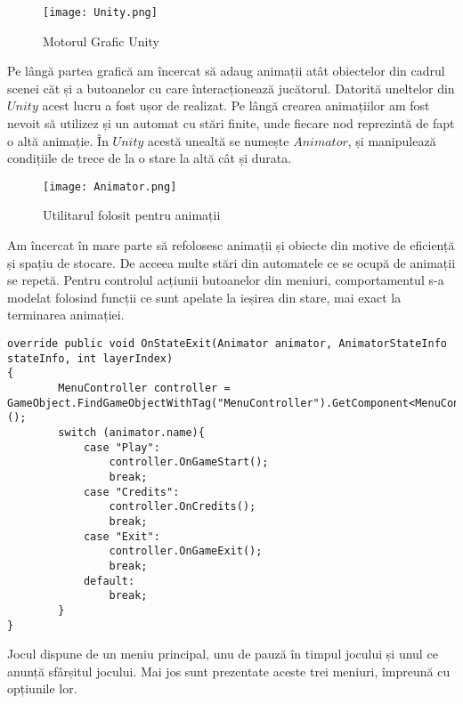 \vspace{10mm}
\begin{figure}[H]
\centering
\texttt{[image: Unity.png]} \par
\caption{Motorul Grafic Unity}
\end{figure}

Pe lângă partea grafică am încercat să adaug animații atât obiectelor din cadrul scenei căt și a butoanelor cu care înteracționează jucătorul. Datorită uneltelor din $Unity$ acest lucru a fost ușor de realizat. Pe lângă crearea animațiilor am fost nevoit să utilizez și un automat cu stări finite, unde fiecare nod reprezintă de fapt o altă animație. În $Unity$ acestă unealtă se numește $Animator$, și manipulează condițiile de trece de la o stare la altă cât și durata.\par

\vspace{10mm}
\begin{figure}[H]
\centering
\texttt{[image: Animator.png]} \par
\caption{Utilitarul folosit pentru animații}
\end{figure}

Am încercat în mare parte să refolosesc animații și obiecte din motive de eficiență și spațiu de stocare. De acceea multe stări din automatele ce se ocupă de animații se repetă. Pentru controlul acțiunii butoanelor din meniuri, comportamentul s-a modelat folosind funcții ce sunt apelate la ieșirea din stare, mai exact la terminarea animației.\par

\begin{lstlisting}[caption=Exemplu de folosire a evenimentului $OnStateExit$]
override public void OnStateExit(Animator animator, AnimatorStateInfo stateInfo, int layerIndex)
{
        MenuController controller = GameObject.FindGameObjectWithTag("MenuController").GetComponent<MenuController>();
        switch (animator.name){
            case "Play":
                controller.OnGameStart();
                break;
            case "Credits":
                controller.OnCredits();
                break;
            case "Exit":
                controller.OnGameExit();
                break;
            default:
                break;
        }
}
\end{lstlisting}

Jocul dispune de un meniu principal, unu de pauză în timpul jocului și unul ce anunță sfârșitul jocului. Mai jos sunt prezentate aceste trei meniuri, împreună cu opțiunile lor.\par

